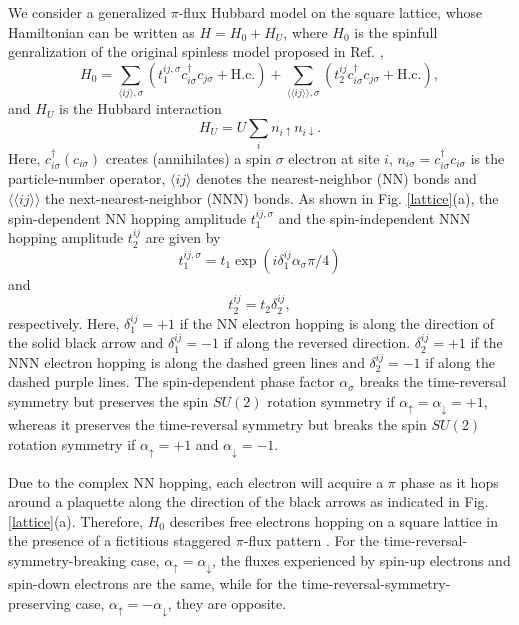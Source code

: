 \documentclass[amsmath,superscriptaddress,showpacs,aps,prb,twocolumn]{revtex4-1}
\begin{document}
\par We consider a generalized $\pi$-flux Hubbard model on the square lattice, whose Hamiltonian can be written as $H=H_0+H_U$, where $H_0$ is the spinfull genralization of the original spinless model proposed in Ref. ,
\begin{equation}
H_0=\sum_{\langle ij\rangle,\sigma}(t_1^{ij,\sigma}c_{i\sigma}^\dagger c_{j\sigma}+\text{H.c.})
    +\sum_{\langle\langle ij\rangle\rangle,\sigma}(t_2^{ij}c_{i\sigma}^\dagger c_{j\sigma}+\text{H.c.}),
\end{equation}
and $H_U$ is the Hubbard interaction
\begin{equation}
H_U=U\sum_{i}n_{i\uparrow}n_{i\downarrow}.
\end{equation}
Here, $c_{i\sigma}^{\dagger}(c_{i\sigma})$ creates (annihilates) a spin $\sigma$ electron at site $i$, $n_{i\sigma}=c^{\dag}_{i\sigma}c_{i\sigma}$ is the particle-number operator, $\langle ij\rangle$ denotes the nearest-neighbor (NN) bonds and $\langle\langle ij\rangle\rangle$ the next-nearest-neighbor (NNN) bonds. As shown in Fig. \ref{lattice}(a), the spin-dependent NN hopping amplitude $t_1^{ij,\sigma}$ and the spin-independent NNN hopping amplitude $t_2^{ij}$ are given by
\begin{equation}
t_1^{ij,\sigma}=t_1\exp\left(i\delta_1^{ij}\alpha_\sigma\pi/4\right)
\end{equation}
and
\begin{equation}
t_2^{ij}=t_2\delta_2^{ij},
\end{equation}
respectively. Here, $\delta_1^{ij}=+1$ if the NN electron hopping is along the direction of the solid black arrow and $\delta_1^{ij}=-1$ if along the reversed direction. $\delta_2^{ij}=+1$ if the NNN electron hopping is along the dashed green lines and $\delta_2^{ij}=-1$ if along the dashed purple lines. The spin-dependent phase factor $\alpha_\sigma$ breaks the time-reversal symmetry but preserves the spin $SU(2)$ rotation symmetry if $\alpha_\uparrow=\alpha_\downarrow=+1$, whereas it preserves the time-reversal symmetry but breaks the spin $SU(2)$ rotation symmetry if $\alpha_\uparrow=+1$ and $\alpha_\downarrow=-1$.

\par Due to the complex NN hopping, each electron will acquire a $\pi$ phase as it hops around a plaquette along the direction of the black arrows as indicated in Fig. \ref{lattice}(a). Therefore, $H_0$ describes free electrons hopping on a square lattice in the presence of a fictitious staggered $\pi$-flux pattern \cite{WWZ_PRB1989}. For the time-reversal-symmetry-breaking case, $\alpha_\uparrow=\alpha_\downarrow$, the fluxes experienced by spin-up electrons and spin-down electrons are the same, while for the time-reversal-symmetry-preserving case, $\alpha_\uparrow=-\alpha_\downarrow$, they are opposite.
\end{document}

